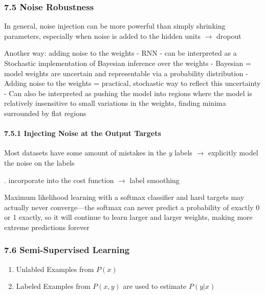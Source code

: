 \documentclass[11pt]{article}
\providecommand{\tightlist}{%
      \setlength{\itemsep}{0pt}\setlength{\parskip}{0pt}}
\begin{document}
    \hypertarget{noise-robustness}{%
\subsubsection{7.5 Noise Robustness}\label{noise-robustness}}

    In general, noise injection can be more powerful than simply shrinking
parameters, especially when noise is added to the hidden units
\(\rightarrow\) dropout

    Another way: adding noise to the weights - RNN - can be interpreted as a
Stochastic implementation of Bayesian inference over the weights -
Bayesian = model weights are uncertain and representable via a
probability distribution - Adding noise to the weights = practical,
stochastic way to reflect this uncertainty - Can also be interpreted as
pushing the model into regions where the model is relatively insensitive
to small variations in the weights, finding minima surrounded by flat
regions

    \hypertarget{injecting-noise-at-the-output-targets}{%
\paragraph{7.5.1 Injecting Noise at the Output
Targets}\label{injecting-noise-at-the-output-targets}}

    Most datasets have some amount of mistakes in the \(y\) labels
\(\rightarrow\) explicitly model the noise on the labels

    . incorporate into the cost function \(\rightarrow\) label smoothing

    Maximum likelihood learning with a softmax classifier and hard targets
may actually never converge---the softmax can never predict a
probability of exactly 0 or 1 exactly, so it will continue to learn
larger and larger weights, making more extreme predictions forever

    \hypertarget{semi-supervised-learning}{%
\subsubsection{7.6 Semi-Supervised
Learning}\label{semi-supervised-learning}}

    \begin{enumerate}
\def\labelenumi{\arabic{enumi}.}
\tightlist
\item
  Unlabled Examples from \(P(x)\)
\item
  Labeled Examples from \(P(x,y)\) are used to estimate \(P(y|x)\)
\end{enumerate}
\end{document}
